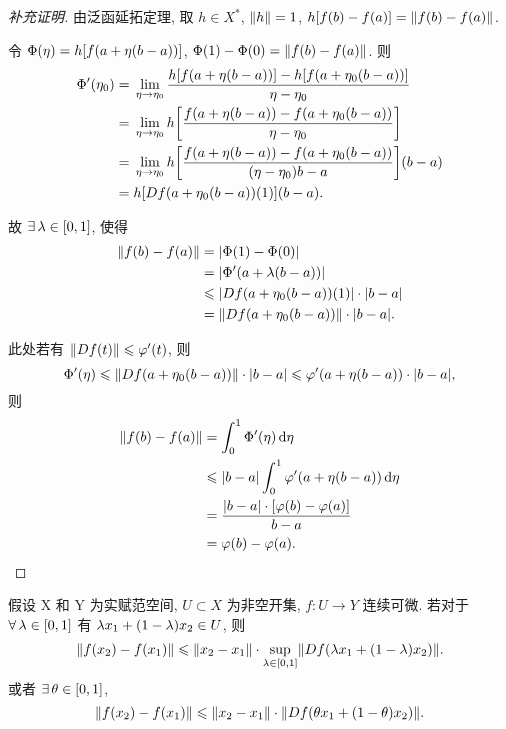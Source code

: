 \begin{proof}[补充证明]
由泛函延拓定理, 取 $h\in X^*$, $\left\Vert h\right\Vert=1$, $h\zk{f\xk{b}-f\xk{a}}=\fs{f\xk{b}-f\xk{a}}$.\par 
令 $\Phi\xk{\eta}=h\zk{f\xk{a+\eta\xk{b-a}}}$, $\Phi\xk{1}-\Phi\xk{0}=\fs{f\xk{b}-f\xk{a}}$. 则
\begin{align*}
\Phi'\xk{\eta_{0}}=&\; \lim _{\eta\to\eta_{0}}\frac{h\zk{f\xk{a+\eta\xk{b-a}}}-h\zk{f\xk{a+\eta_{0}\xk{b-a}}}}{\eta-\eta_{0}}\\
=&\; \lim _{\eta\to\eta_{0}}h\zk{\frac{f\xk{a+\eta\xk{b-a}}-f\xk{a+\eta_{0}\xk{b-a}}}{\eta-\eta_{0}}}\\
=&\; \lim _{\eta\to\eta_{0}}h\zk{\frac{f\xk{a+\eta\xk{b-a}}-f\xk{a+\eta_{0}\xk{b-a}}}{\xk{\eta-\eta_{0}}{b-a}}}\xk{b-a}\\
=&\;h\zk{Df\xk{a+\eta_{0}\xk{b-a}}\xk{1}}\xk{b-a}.
\end{align*}

故 $\exists\lambda\in\zk{0,1}$, 使得
\begin{align*}
\fs{f\xk{b}-f\xk{a}}&=\jd{\Phi\xk{1}-\Phi\xk{0}}\\
&= \jd{\Phi'\xk{a+\lambda\xk{b-a}}}\\
&\leq \jd{Df\xk{a+\eta_{0}\xk{b-a}}\xk{1}}\cdot\jd{b-a}\\
&= \fs{Df\xk{a+\eta_{0}\xk{b-a}}}\cdot\jd{b-a}.
\end{align*}

此处若有 $\fs{Df\xk{t}}\leq\phi'\xk{t}$, 则
\[\Phi'\xk{\eta}\leq \fs{Df\xk{a+\eta_{0}\xk{b-a}}}\cdot\jd{b-a}\leq \phi'\xk{a+\eta\xk{b-a}}\cdot\jd{b-a},\]
则
\begin{align*}
\fs{f\xk{b}-f\xk{a}}&= \int_{0}^{1}\Phi'\xk{\eta}\dd\eta\\
&\leq \jd{b-a}\int_{0}^{1}\phi'\xk{a+\eta\xk{b-a}}\dd\eta\\
&=\frac{\jd{b-a}\cdot\zk{\phi\xk{b}-\phi\xk{a}}}{b-a}\\
&=\phi\xk{b}-\phi\xk{a}.\qedhere
\end{align*}
\end{proof}
\begin{corollary}
\label{zhongzhi}
假设 X 和 Y 为实赋范空间, $U\subset X$ 为非空开集, $f:U\to Y$ 连续可微. 若对于 $\forall\lambda\in\zk{0,1}$ 有 $\lambda x_{1}+\xk{1-\lambda}x_{2}\in U$, 则
\[\fs{f\xk{x_{2}}-f\xk{x_{1}}}\leq\fs{x_{2}-x_{1}}\cdot\sup _{\lambda\in\zk{0,1}}\fs{Df\xk{\lambda x_{1}+\xk{1-\lambda}x_{2}}}.\]
或者 $\exists\theta\in\zk{0,1}$,
\[\fs{f\xk{x_{2}}-f\xk{x_{1}}}\leq\fs{x_{2}-x_{1}}\cdot\fs{Df\xk{\theta x_{1}+\xk{1-\theta}x_{2}}}.\]
\end{corollary}
